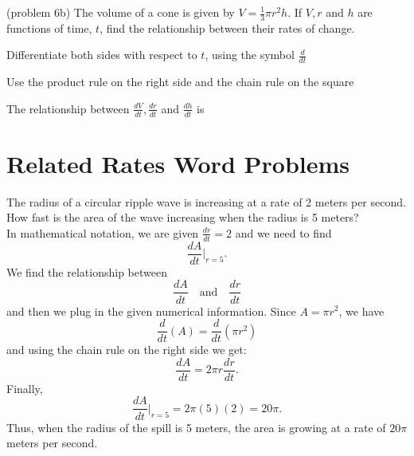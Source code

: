\documentclass{ximera}
\begin{document}
\begin{problem}(problem 6b)
The volume of a cone is given by $V = \frac13 \pi r^2h$. If $V, r$ and $h$ are functions of time, $t$,
find the relationship between their rates of change.\\
\begin{hint}
Differentiate both sides with respect to $t$, using the symbol $\frac{d}{dt}$
\end{hint}
\begin{hint}
Use the product rule on the right side and the chain rule on the square
\end{hint}

The relationship between $\frac{dV}{dt}, \frac{dr}{dt}$ and $\frac{dh}{dt}$ is
\begin{multipleChoice}
\end{multipleChoice}
\end{problem}






\section{Related Rates Word Problems}




\begin{example}[example 7]
The radius of a circular ripple wave is increasing at a rate of 2 meters per second. How fast is the area of the wave 
increasing when the radius is 5 meters? \\
In mathematical notation, we are given $\frac{dr}{dt} = 2$ and we need to find
\[\frac{dA}{dt}\bigg|_{r = 5}.\]
We find the relationship between 
\[\frac{dA}{dt} \quad \text{and} \quad \frac{dr}{dt}\]
and then we plug in the given numerical information.
Since $A = \pi r^2$, we have
\[\frac{d}{dt} (A) = \frac{d}{dt}(\pi r^2)  \]
and using the chain rule on the right side we get:
\[\frac{dA}{dt}  = 2\pi r \frac{dr}{dt}.\]
Finally,
\[\frac{dA}{dt}\bigg|_{r = 5}  = 2\pi (5) (2) = 20\pi.\]
Thus, when the radius of the spill is 5 meters, the area is growing at a rate of $20\pi$ meters per second.
\end{example}
\end{document}
